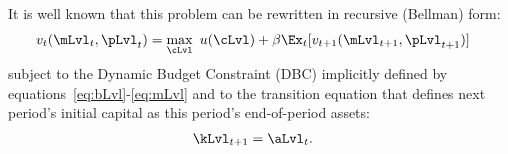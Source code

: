 It is well known that this problem can be rewritten in recursive (Bellman) form:
  \begin{equation}\begin{gathered}\begin{aligned}
        \vFunc_{\prd}(\mLvl_{\prd},\pLvl_{\prd})  & = \max_{\cLvl}~ \uFunc(\cLvl) + \DiscFac \Ex_{\prd}[ \vFunc_{\prd+1}(\mLvl_{\prd+1},\pLvl_{\prd+1})]\label{eq:vrecurse}
      \end{aligned}\end{gathered}\end{equation}
subject to the Dynamic Budget Constraint (DBC) implicitly defined by equations~\eqref{eq:bLvl}-\eqref{eq:mLvl} and to the transition equation that defines next period's initial capital as this period's end-of-period assets:
\begin{equation}\begin{gathered}\begin{aligned}
      \kLvl_{\prd+1} & = \aLvl_{\prd}. \label{eq:transitionstate}
    \end{aligned}\end{gathered}\end{equation}

\onlyinsubfile{}
